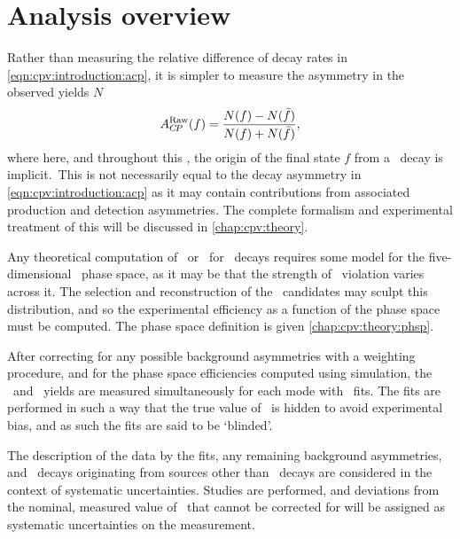 \section{Analysis overview}
\label{chap:cpv:introduction:overview}

Rather than measuring the relative difference of decay rates in
\cref{eqn:cpv:introduction:acp}, it is simpler to measure the asymmetry in the
observed yields $N$
\begin{equation}
  A_{C\!P}^{\textnormal{Raw}}(f) = \frac{N(f) - N(\bar{f})}{N(f) + N(\bar{f})},
  \label{eqn:cpv:introduction:araw}
\end{equation}
where here, and throughout this , the origin of the final
state $f$ from a \PLambdac\ decay is implicit.\footnotemark\
This is not necessarily equal to the decay asymmetry in
\cref{eqn:cpv:introduction:acp} as it may contain contributions from associated
production and detection asymmetries.
The complete formalism and experimental treatment of this will be discussed in
\cref{chap:cpv:theory}.


Any theoretical computation of \ACP\ or \dACP\ for \LcTophh\ decays requires
some model for the five-dimensional \phh\ phase space, as it may be that the
strength of \CP\ violation varies across it.
The selection and reconstruction of the \PLambdac\ candidates may sculpt this
distribution, and so the experimental efficiency as a function of the phase
space must be computed.
The phase space definition is given \cref{chap:cpv:theory:phsp}.

After correcting for any possible background asymmetries with a weighting
procedure, and for the phase space efficiencies computed using simulation, the
\PLambdac\ and \APLambdac\ yields are measured simultaneously for each mode
with \chisq\ fits.
The fits are performed in such a way that the true value of \ARaw\ is hidden to
avoid experimental bias, and as such the fits are said to be `blinded'.

The description of the data by the fits, any remaining background asymmetries,
and \PLambdac\ decays originating from sources other than \PLambdab\ decays are
considered in the context of systematic uncertainties.
Studies are performed, and deviations from the nominal, measured value of
\dACP\ that cannot be corrected for will be assigned as systematic
uncertainties on the measurement.

